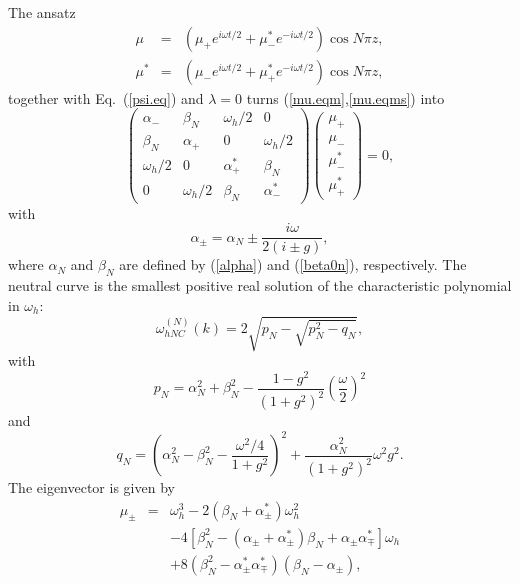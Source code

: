 The ansatz 
\begin{equation}\begin{array}{rcl}
  \mu&=&\left(\mu_+e^{i\omega t/2}+\mu_-^*e^{-i\omega t/2}\right)
   \cos N\pi z,\\\mu^*&=&\left(\mu_-e^{i\omega t/2}+\mu^*_+
   e^{-i\omega t/2}\right)\cos N\pi z,\end{array}
  \label{mu.ans}
\end{equation}
together with Eq.~(\ref{psi.eq}) and $\lambda=0$ turns 
(\ref{mu.eqm},\ref{mu.eqms}) into 
\begin{equation}
  \left(\begin{array}{cccc}
   \alpha_-&\beta_N&\omega_h/2&0\\\beta_N&\alpha_+&0&\omega_h/2\\
   \omega_h/2&0&\alpha^*_+&\beta_N\\0&\omega_h/2&\beta_N&
   \alpha^*_-\end{array}\right)\left(\begin{array}{c}\mu_+\\\mu_-
   \\\mu^*_-\\\mu^*_+\end{array}\right)=0,
  \label{mu0.eq}
\end{equation}
with
\begin{equation}
 \alpha_\pm=\alpha_N\pm\frac{i\omega}{2(i\pm g)},
  \label{alphapm}
\end{equation}
where $\alpha_N$ and $\beta_N$ are defined by (\ref{alpha}) and
(\ref{beta0n}), respectively. 
The neutral curve is the smallest positive real solution of the 
characteristic polynomial in $\omega_h$:
\begin{equation}
  \omega_{hNC}^{(N)}(k)=2\sqrt{p_N-\sqrt{p_N^2-q_N}},
  \label{whnn}
\end{equation}
with
\begin{equation}
  p_N=\alpha_N^2+\beta_N^2-\frac{1-g^2}{(1+g^2)^2}
   \left(\frac{\omega}{2}\right)^2
  \label{whnnp}
\end{equation}
and
\begin{equation}
  q_N=\left(\alpha_N^2-\beta_N^2-\frac{\omega^2/4}{1+g^2}\right)^2
   +\frac{\alpha_N^2}{(1+g^2)^2}\omega^2g^2.
  \label{whnnq}
\end{equation}
The eigenvector is given by 
\begin{eqnarray}
  \mu_\pm&=&\omega_h^3-2(\beta_N+\alpha^*_\pm)\omega_h^2\nonumber\\
   &&-4[\beta_N^2-(\alpha_\pm+\alpha^*_\pm)\beta_N+\alpha_\pm
   \alpha^*_\mp]  \omega_h\nonumber\\
   &&+8(\beta_N^2-\alpha^*_\pm\alpha^*_\mp)(\beta_N-\alpha_\pm),
  \label{mu.pm}
\end{eqnarray}
